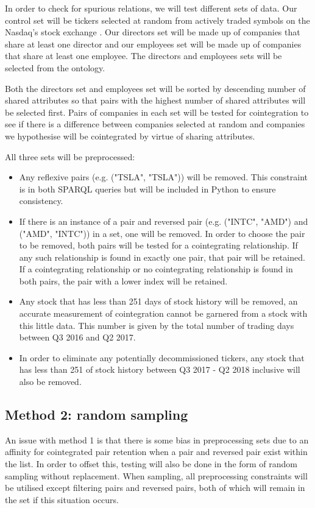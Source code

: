 \documentclass{UoYCSproject}
\begin{document}
In order to check for spurious relations, we will test different sets of data. Our control set will be tickers selected at random from actively traded symbols on the Nasdaq's stock exchange \parencite{nasdaq}. Our directors set will be made up of companies that share at least one director and our employees set will be made up of companies that share at least one employee. The directors and employees sets will be selected from the ontology.

Both the directors set and employees set will be sorted by descending number of shared attributes so that pairs with the highest number of shared attributes will be selected first. Pairs of companies in each set will be tested for cointegration to see if there is a difference between companies selected at random and companies we hypothesise will be cointegrated by virtue of sharing attributes.

All three sets will be preprocessed:
\begin{itemize}
    \item Any reflexive pairs (e.g. ("TSLA", "TSLA")) will be removed. This constraint is in both SPARQL queries but will be included in Python to ensure consistency.
    \item If there is an instance of a pair and reversed pair (e.g. ("INTC", "AMD") and ("AMD", "INTC")) in a set, one will be removed. In order to choose the pair to be removed, both pairs will be tested for a cointegrating relationship. If any such relationship is found in exactly one pair, that pair will be retained. If a cointegrating relationship or no cointegrating relationship is found in both pairs, the pair with a lower index will be retained.
    \item Any stock that has less than 251 days of stock history will be removed, an accurate measurement of cointegration cannot be garnered from a stock with this little data. This number is given by the total number of trading days between Q3 2016 and Q2 2017.
    \item In order to eliminate any potentially decommissioned tickers, any stock that has less than 251 of stock history between Q3 2017 - Q2 2018 inclusive will also be removed.
\end{itemize}

\subsection{Method 2: random sampling}

An issue with method 1 is that there is some bias in preprocessing sets due to an affinity for cointegrated pair retention when a pair and reversed pair exist within the list. In order to offset this, testing will also be done in the form of random sampling without replacement. When sampling, all preprocessing constraints will be utilised except filtering pairs and reversed pairs, both of which will remain in the set if this situation occurs. 
\end{document}
